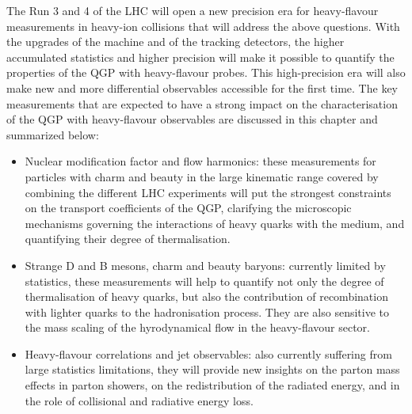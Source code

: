 The Run 3 and 4 of the LHC will open a new precision era for heavy-flavour measurements in heavy-ion collisions that will address the above questions. 
With the upgrades of the machine and of the tracking detectors, the higher accumulated statistics and higher precision will make it possible to quantify the properties of the QGP with heavy-flavour probes. This high-precision era will also make new and more differential observables accessible for the first time.
The key measurements that are expected to have a strong impact on the characterisation of the QGP with heavy-flavour observables are discussed in this chapter and summarized below:
\begin{itemize}
\item Nuclear modification factor and flow harmonics: these measurements for particles with charm and beauty in the large kinematic range covered by combining the different LHC experiments will put the strongest constraints on the transport coefficients of the QGP, clarifying the microscopic mechanisms governing the interactions of heavy quarks with the medium, and quantifying their degree of thermalisation.
\item Strange D and B mesons, charm and beauty baryons: currently limited by statistics, these measurements will help to quantify not only the degree of thermalisation of heavy quarks, but also the contribution of recombination with lighter quarks to the hadronisation process. They are also sensitive to the mass scaling of the hyrodynamical flow in the heavy-flavour sector.

\item Heavy-flavour correlations and jet observables: also currently suffering from large statistics limitations, they will provide new insights on the parton mass effects in parton showers, on the redistribution of the radiated energy, and in the role of collisional and radiative energy loss.

\end{itemize}


